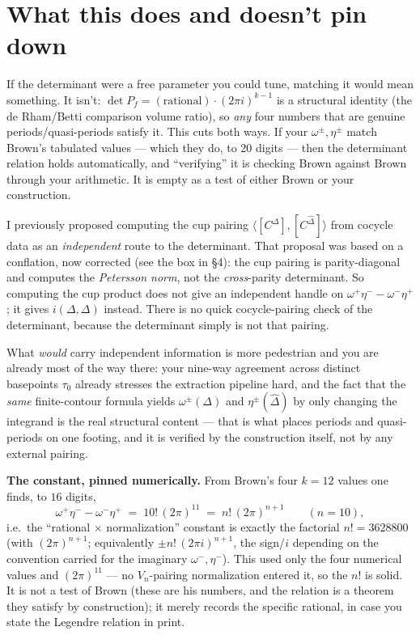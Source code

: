 \documentclass[11pt]{article}
\newcommand{\Dhat}{\widehat{\Delta}}
\begin{document}
\section{What this does and doesn't pin down}

If the determinant were a free parameter you could tune, matching it would
mean something. It isn't: $\det P_f = (\text{rational})\cdot(2\pi i)^{k-1}$
is a structural identity (the de Rham/Betti comparison volume ratio), so
\emph{any} four numbers that are genuine periods/quasi-periods satisfy it.
This cuts both ways. If your $\omega^\pm, \eta^\pm$ match Brown's tabulated
values --- which they do, to 20 digits --- then the determinant relation
holds automatically, and ``verifying'' it is checking Brown against Brown
through your arithmetic. It is empty as a test of either Brown or your
construction.

I previously proposed computing the cup pairing
$\langle[C^\Delta],[C^{\Dhat}]\rangle$ from cocycle data as an
\emph{independent} route to the determinant. That proposal was based on a
conflation, now corrected (see the box in \S4): the cup pairing is
parity-diagonal and computes the \emph{Petersson norm}, not the
\emph{cross}-parity determinant. So computing the cup product does not give
an independent handle on $\omega^+\eta^- - \omega^-\eta^+$; it gives
$i(\Delta,\Delta)$ instead. There is no quick cocycle-pairing check of the
determinant, because the determinant simply is not that pairing.

What \emph{would} carry independent information is more pedestrian and you
are already most of the way there: your nine-way agreement across distinct
basepoints $\tau_0$ already stresses the extraction pipeline hard, and the
fact that the \emph{same} finite-contour formula yields $\omega^\pm(\Delta)$
and $\eta^\pm(\Dhat)$ by only changing the integrand is the real structural
content --- that is what places periods and quasi-periods on one footing,
and it is verified by the construction itself, not by any external pairing.

\medskip
\noindent\textbf{The constant, pinned numerically.} From Brown's four
$k=12$ values one finds, to $16$ digits,
\[
  \omega^+\eta^- - \omega^-\eta^+ \;=\; 10!\,(2\pi)^{11}
  \;=\; n!\,(2\pi)^{n+1}
  \qquad (n = 10),
\]
i.e.\ the ``rational $\times$ normalization'' constant is exactly the
factorial $n! = 3628800$ (with $(2\pi)^{n+1}$; equivalently $\pm n!\,(2\pi
i)^{n+1}$, the sign/$i$ depending on the convention carried for the
imaginary $\omega^-,\eta^-$). This used only the four numerical values and
$(2\pi)^{11}$ --- no $V_n$-pairing normalization entered it, so the $n!$ is
solid. It is not a test of Brown (these are his numbers, and the relation
is a theorem they satisfy by construction); it merely records the specific
rational, in case you state the Legendre relation in print.
\end{document}
